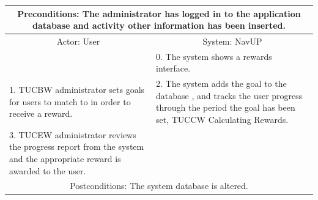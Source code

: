 ﻿\documentclass{article}
\begin{document}
       		 \begin{tabular}{|p{6cm}|p{6cm}|}
       		 \hline
       		\multicolumn{2}{c}{\parbox{12cm}{\vspace{2mm} Preconditions: The administrator has logged in to the application database and activity other information has been inserted.\vspace{2mm}}} \\
       		 \hline
       		\multicolumn{1}{c}{Actor: User} & \multicolumn{1}{c}{ System: NavUP} \\
        		\hline
       		 &0.	The system shows a rewards interface.\\
       		 \hline
       		1.	TUCBW administrator sets goals for users to match to in order to receive a reward.
 &2.	The system adds the goal to the database , and tracks the user progress through the period the goal has been set, TUCCW Calculating Rewards.
\\
        		\hline
       		3.	TUCEW administrator reviews the progress report from the system and the appropriate reward is awarded to the user.&\\
       		 \hline
        		\multicolumn{2}{c}{Postconditions: The system database is altered. } \\
        		\hline
        \end{tabular} 
     
\end{document}
